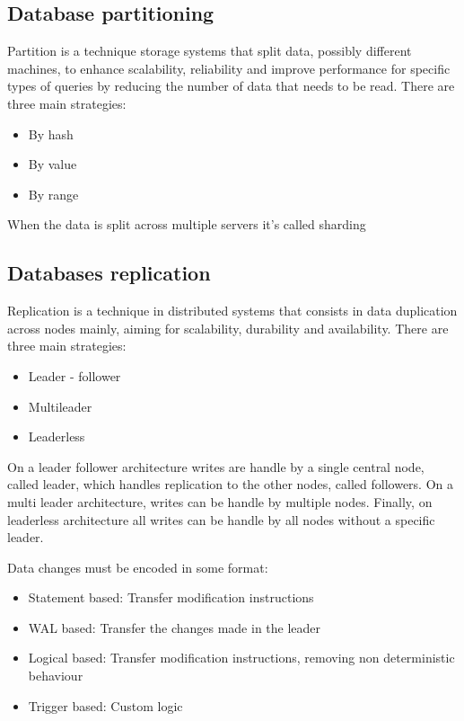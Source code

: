 \documentclass[../../main.tex]{subfiles}
\begin{document}
\subsection{Database partitioning}
Partition is a technique storage systems that split data, possibly different machines,
to enhance scalability, reliability and improve performance for specific types of
queries by reducing the number of data that needs to be read. There are three main
strategies:
\begin{itemize}
    \item By hash
    \item By value
    \item By range
\end{itemize}
When the data is split across multiple servers it's called sharding


\subsection{Databases replication}
Replication is a technique in distributed systems that consists in data duplication
across nodes mainly, aiming for scalability, durability and availability. There are
three main strategies:
\begin{itemize}
    \item Leader - follower
    \item Multileader
    \item Leaderless
\end{itemize}
On a leader follower architecture writes are handle by a single central node, called
leader, which handles replication to the other nodes, called followers. On a multi
leader architecture, writes can be handle by multiple nodes. Finally, on leaderless
architecture all writes can be handle by all nodes without a specific leader.

Data changes must be encoded in some format:
\begin{itemize}
    \item Statement based: Transfer modification instructions
    \item WAL based: Transfer the changes made in the leader
    \item Logical based: Transfer modification instructions, removing non deterministic behaviour
    \item Trigger based: Custom logic
\end{itemize}
\end{document}

